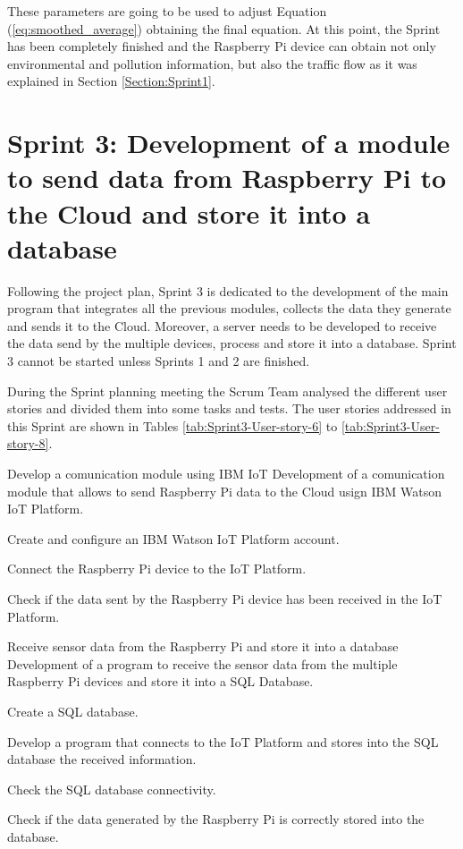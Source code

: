 These parameters are going to be used to adjust Equation (\ref{eq:smoothed_average}) obtaining the final equation. At this point, the Sprint has been completely finished and the Raspberry Pi device can obtain not only environmental and pollution information, but also the traffic flow as it was explained in Section \ref{Section:Sprint1}.


\section{Sprint 3: Development of a module to send data from Raspberry Pi to the Cloud and store it into a database}
Following the project plan, Sprint 3 is dedicated to the development of the main program that integrates all the previous modules, collects the data they generate and sends it to the Cloud. Moreover, a server needs to be developed to receive the data send by the multiple devices, process and store it into a database. Sprint 3 cannot be started unless Sprints 1 and 2 are finished.

During the Sprint planning meeting the Scrum Team analysed the different user stories and divided them into some tasks and tests. The user stories addressed in this Sprint are shown in Tables \ref{tab:Sprint3-User-story-6} to \ref{tab:Sprint3-User-story-8}.

{Develop a comunication module using IBM IoT}
{Development of a comunication module that allows to send Raspberry Pi data to the Cloud usign IBM Watson IoT Platform.}
{	\item Create and configure an IBM Watson IoT Platform account.
	\item Connect the Raspberry Pi device to the IoT Platform.
}{	\item Check if the data sent by the Raspberry Pi device has been received in the IoT Platform.
}

{Receive sensor data from the Raspberry Pi and store it into a database}
{Development of a program to receive the sensor data from the multiple Raspberry Pi devices and store it into a SQL Database.}
{	\item Create a SQL database.
	\item Develop a program that connects to the IoT Platform and stores into the SQL database the received information.
}{	\item Check the SQL database connectivity.
	\item Check if the data generated by the Raspberry Pi is correctly stored into the database.
}

